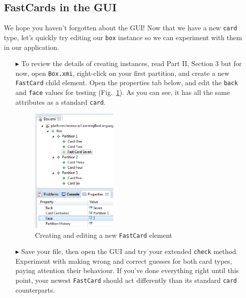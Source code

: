 \newpage
\hypertarget{subsec:fastGUI}{}
\subsection{FastCards in the GUI}
\genHeader

We hope you haven't forgotten about the GUI! Now that we have a new \texttt{card} type, let's quickly try editing our \texttt{box} instance so we can experiment
with them in our application.

\begin{itemize}
  
\item[$\blacktriangleright$] To review the details of creating instances, read Part II, Section 3 but for now, open \texttt{Box.xmi}, right-click on your
first partition, and create a new \texttt{FastCard} child element. Open the properties tab below, and edit the \texttt{back} and \texttt{face} values for
testing (Fig.~\ref{fig:fastCardProperties}). As you can see, it has all the same attributes as a standard \texttt{card}.

\vspace{0.5cm}

\begin{figure}[htbp]
\begin{center}
  \includegraphics[width=0.4\textwidth]{eclipse_fastCardProperties}
  \caption{Creating and editing a new \texttt{FastCard} element}  
  \label{fig:fastCardProperties}
\end{center}
\end{figure}

\item[$\blacktriangleright$] Save your file, then open the GUI and try your extended \texttt{check} method. Experiment with making wrong and correct
guesses for both card types, paying attention their behaviour. If you've done everything right until this point, your newest \texttt{FastCard} should act
differently than its standard \texttt{card} counterparts.

\end{itemize}
